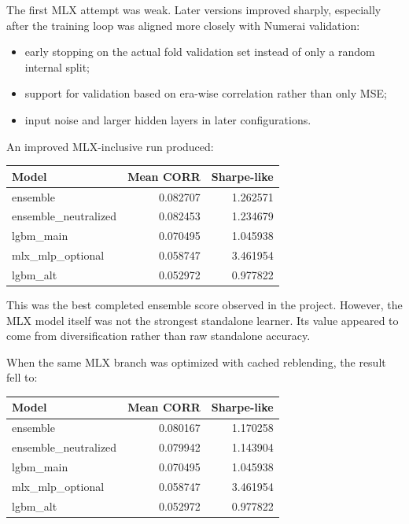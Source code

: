 \documentclass[11pt]{article}
\begin{document}
The first MLX attempt was weak. Later versions improved sharply, especially after the training loop was aligned more closely with Numerai validation:

\begin{itemize}[leftmargin=1.5em]
  \item early stopping on the actual fold validation set instead of only a random internal split;
  \item support for validation based on era-wise correlation rather than only MSE;
  \item input noise and larger hidden layers in later configurations.
\end{itemize}

An improved MLX-inclusive run produced:

\begin{center}
\begin{tabular}{lrr}
\toprule
Model & Mean CORR & Sharpe-like \\
\midrule
ensemble & 0.082707 & 1.262571 \\
ensemble\_neutralized & 0.082453 & 1.234679 \\
lgbm\_main & 0.070495 & 1.045938 \\
mlx\_mlp\_optional & 0.058747 & 3.461954 \\
lgbm\_alt & 0.052972 & 0.977822 \\
\bottomrule
\end{tabular}
\end{center}

This was the best completed ensemble score observed in the project. However, the MLX model itself was not the strongest standalone learner. Its value appeared to come from diversification rather than raw standalone accuracy.

When the same MLX branch was optimized with cached reblending, the result fell to:

\begin{center}
\begin{tabular}{lrr}
\toprule
Model & Mean CORR & Sharpe-like \\
\midrule
ensemble & 0.080167 & 1.170258 \\
ensemble\_neutralized & 0.079942 & 1.143904 \\
lgbm\_main & 0.070495 & 1.045938 \\
mlx\_mlp\_optional & 0.058747 & 3.461954 \\
lgbm\_alt & 0.052972 & 0.977822 \\
\bottomrule
\end{tabular}
\end{center}
\end{document}
